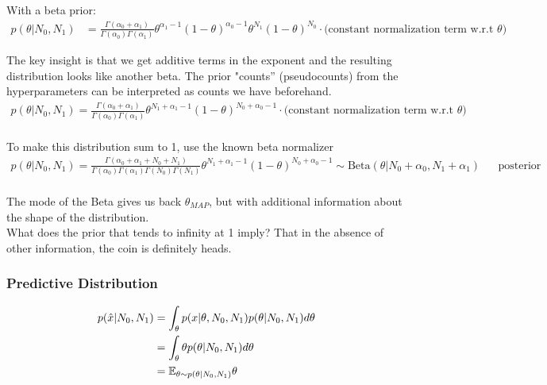 \documentclass{article}
\begin{document}
\noindent With a beta prior: 
\begin{align*}
p(\theta|N_0,N_1) &= \frac{\Gamma(\alpha_0 + \alpha_1)}{\Gamma(\alpha_0)\Gamma(\alpha_1)} \theta^{\alpha_1-1} (1-\theta)^{\alpha_0-1} \theta^{N_1}(1-\theta)^{N_0} \cdot \textrm{(constant normalization term w.r.t $\theta$)} 
\end{align*}

\noindent The key insight is that we get additive terms in the exponent and the resulting distribution looks like another beta. The prior "counts'' (pseudocounts) from the hyperparameters can be interpreted as counts we have beforehand. \\

\begin{align*}
p(\theta|N_0,N_1) = \frac{\Gamma(\alpha_0 + \alpha_1)}{\Gamma(\alpha_0)\Gamma(\alpha_1)} \theta^{N_1 + \alpha_1-1} (1-\theta)^{N_0 + \alpha_0-1} \cdot \textrm{(constant normalization term w.r.t $\theta$)} \\
\end{align*}

\noindent To make this distribution sum to 1, use the known beta normalizer \\

\begin{align*}
p(\theta|N_0,N_1) = \frac{\Gamma(\alpha_0 + \alpha_1 + N_0 + N_1)}{\Gamma(\alpha_0)\Gamma(\alpha_1)\Gamma(N_0)\Gamma(N_1)} \theta^{N_1 + \alpha_1-1} (1-\theta)^{N_0 + \alpha_0-1} \sim \textrm{Beta}(\theta | N_0 + \alpha_0, N_1 + \alpha_1) && \text{posterior distribution} \\
\end{align*}

\noindent The mode of the Beta gives us back $\theta_{MAP}$, but with additional information about the shape of the distribution. \\
What does the prior that tends to infinity at 1 imply? That in the absence of other information, the coin is definitely heads. \\


\subsubsection*{Predictive Distribution}

\begin{align*}
p(\hat{x}| N_0, N_1) &= \int_\theta p(x|\theta, N_0, N_1) p(\theta | N_0, N_1) d\theta \\
&= \int_\theta \theta p(\theta | N_0, N_1) d\theta \\
&= \mathbb{E}_{\theta \sim p(\theta|N_0, N_1)} \theta \\
\end{align*}
\end{document}
